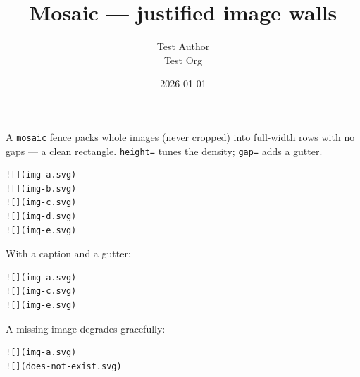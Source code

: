 \documentclass[11pt,a4paper]{article}
\title{Mosaic — justified image walls}
\author{Test Author \\ Test Org}
\date{2026-01-01}
\theoremstyle{definition}
\begin{document}
\maketitle

A \texttt{mosaic} fence packs whole images (never cropped) into full-width
rows with no gaps — a clean rectangle. \texttt{height=} tunes the density;
\texttt{gap=} adds a gutter.


\begin{lstlisting}
![](img-a.svg)
![](img-b.svg)
![](img-c.svg)
![](img-d.svg)
![](img-e.svg)
\end{lstlisting}


With a caption and a gutter:


\begin{lstlisting}
![](img-a.svg)
![](img-c.svg)
![](img-e.svg)
\end{lstlisting}


A missing image degrades gracefully:


\begin{lstlisting}
![](img-a.svg)
![](does-not-exist.svg)
\end{lstlisting}
\end{document}
